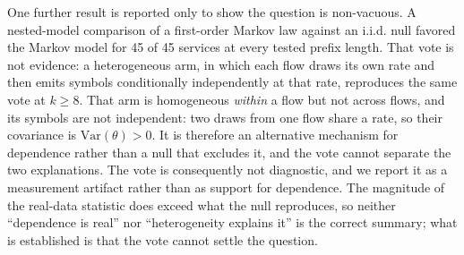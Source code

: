 One further result is reported only to show the question is non-vacuous. A
nested-model comparison of a first-order Markov law against an i.i.d. null
favored the Markov model for 45 of 45 services at every tested prefix length.
That vote is not evidence: a heterogeneous arm, in which each flow draws its own
rate and then emits symbols conditionally independently at that rate, reproduces
the same vote at $k \ge 8$. That arm is homogeneous \emph{within} a flow but not
across flows, and its symbols are not independent: two draws from one flow share
a rate, so their covariance is $\mathrm{Var}(\theta) > 0$. It is therefore an
alternative mechanism for dependence rather than a null that excludes it, and the
vote cannot separate the two explanations. The vote is consequently not
diagnostic, and we report it as a measurement artifact
rather than as support for dependence. The magnitude of the real-data statistic
does exceed what the null reproduces, so neither ``dependence is real'' nor
``heterogeneity explains it'' is the correct summary; what is established is
that the vote cannot settle the question.

